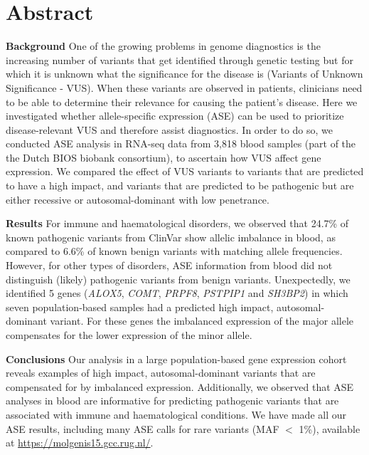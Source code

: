 \section*{Abstract}
\textbf{Background} One of the growing problems in genome diagnostics is the increasing number of variants that get identified through genetic testing but for which it is unknown what the significance for the disease is (Variants of Unknown Significance - VUS)\cite{hoffman-andrewsKnownUnknownChallenges2018,direstaNextgenerationSequencingApproach2018}. When these variants are observed in patients, clinicians need to be able to determine their relevance for causing the patient’s disease. Here we investigated whether allele-specific expression (ASE) can be used to prioritize disease-relevant VUS and therefore assist diagnostics. In order  to do so, we conducted ASE analysis in RNA-seq data from 3,818 blood samples (part of the the Dutch BIOS biobank consortium), to ascertain how VUS affect gene expression. We compared the effect of VUS variants to variants that are predicted to have a high impact, and variants that are predicted to be pathogenic but are either recessive or autosomal-dominant with low penetrance.


\textbf{Results} For immune and haematological disorders, we observed that 24.7\% of known pathogenic variants from ClinVar show allelic imbalance in blood, as compared to 6.6\% of known benign variants with matching allele frequencies. However, for other types of disorders, ASE information from blood did not distinguish (likely) pathogenic variants from benign variants. Unexpectedly, we identified 5 genes (\textit{ALOX5}, \textit{COMT}, \textit{PRPF8}, \textit{PSTPIP1} and \textit{SH3BP2}) in which seven population-based samples had a predicted high impact, autosomal-dominant variant. For these genes the imbalanced expression of the major allele compensates for the lower expression of the minor allele.


\textbf{Conclusions} Our analysis in a large population-based gene expression cohort reveals examples of high impact, autosomal-dominant variants that are compensated for by imbalanced expression. Additionally, we observed that ASE analyses in blood are informative for predicting pathogenic variants that  are associated with immune and haematological conditions. We have made all our ASE results, including many ASE calls for rare variants (MAF $<$ 1\%), available at \url{https://molgenis15.gcc.rug.nl/}. 

